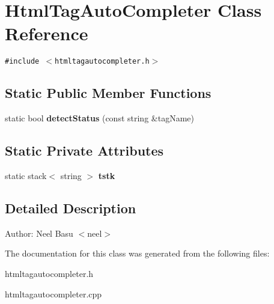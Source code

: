 \section{HtmlTagAutoCompleter Class Reference}
\label{classHtmlTagAutoCompleter}
{\tt \#include $<$htmltagautocompleter.h$>$}

\subsection*{Static Public Member Functions}
\begin{CompactItemize}
\item 
static bool \textbf{detectStatus} (const string \&tagName)\label{classHtmlTagAutoCompleter_d31605fa8bf1d1bb3163a17d121d3ee9}

\end{CompactItemize}
\subsection*{Static Private Attributes}
\begin{CompactItemize}
\item 
static stack$<$ string $>$ \textbf{tstk}\label{classHtmlTagAutoCompleter_ea0c02eb0d947e4baf9880566e79f958}

\end{CompactItemize}


\subsection{Detailed Description}
\begin{Desc}
\item[Author:]Neel Basu $<$neel$>$ \end{Desc}


The documentation for this class was generated from the following files:\begin{CompactItemize}
\item 
htmltagautocompleter.h\item 
htmltagautocompleter.cpp\end{CompactItemize}

